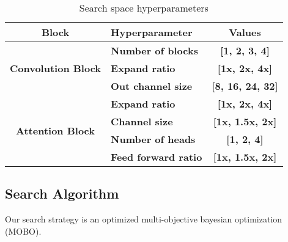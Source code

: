 \documentclass[conference]{IEEEtran}
\begin{document}
\begin{table}[h!]
\begin{tabular}{|c|p{3cm}|c|}
\hline
\textbf{Block}                            & \textbf{Hyperparameter}                                       & \textbf{Values}              \\ \hline
\multirow{3}{*}{\textbf{Convolution Block}}       & \textbf{Number of blocks}                                     & \textbf{{[}1, 2, 3, 4{]}}   \\ \cline{2-3} 
                                           & \textbf{Expand ratio}                    & \textbf{{[}1x, 2x, 4x{]}}      \\ \cline{2-3} 
                                           & \textbf{Out channel size}                                     & \textbf{{[}8, 16, 24, 32{]}} \\ \hline
\multirow{5}{*}{\textbf{Attention Block}} & 
     \textbf{Expand ratio}                    & \textbf{{[}1x, 2x, 4x{]}}      \\ \cline{2-3} 
                                           & \textbf{Channel size}                                         & \textbf{{[}1x, 1.5x, 2x{]}}      \\ \cline{2-3} 
                                           & \textbf{Number of  heads}                                     & \textbf{{[}1, 2, 4{]}}      \\ \cline{2-3} 
                                           & \textbf{Feed forward ratio} & \textbf{{[}1x, 1.5x,  2x{]}}   \\ \hline
\end{tabular}
\caption{Search space hyperparameters}
\label{tab:1}
\vspace{-0.5cm}
\end{table}
 
\subsection{Search Algorithm}
\label{sec:search_strategy}


Our search strategy is an optimized multi-objective bayesian optimization (MOBO). 
\end{document}
